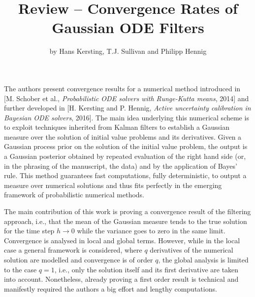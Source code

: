 \documentclass{article}
\title{\myfont Review -- Convergence Rates of Gaussian ODE Filters}
\author{by Hans Kersting, T.J. Sullivan and Philipp Hennig}
\date{}
\begin{document}
\maketitle

The authors present convergence results for a numerical method introduced in [M. Schober et al., \textit{Probabilistic ODE solvers with Runge-Kutta means}, 2014] and further developed in [H. Kersting and P. Hennig, \textit{Active uncertainty calibration in Bayesian ODE solvers}, 2016]. The main idea underlying this numerical scheme is to exploit techniques inherited from Kalman filters to establish a Gaussian measure over the solution of initial value problems and its derivatives. Given a Gaussian process prior on the solution of the initial value problem, the output is a Gaussian posterior obtained by repeated evaluation of the right hand side (or, in the phrasing of the manuscript, the data) and by the application of Bayes' rule. This method guarantees fast computations, fully deterministic, to output a measure over numerical solutions and thus fits perfectly in the emerging framework of probabilistic numerical methods.

The main contribution of this work is proving a convergence result of the filtering approach, i.e., that the mean of the Gaussian measure tends to the true solution for the time step $h \to 0$ while the variance goes to zero in the same limit. Convergence is analysed in local and global terms. However, while in the local case a general framework is considered, where $q$ derivatives of the numerical solution are modelled and convergence is of order $q$, the global analysis is limited to the case $q = 1$, i.e., only the solution itself and its first derivative are taken into account. Nonetheless, already proving a first order result is technical and manifestly required the authors a big effort and lengthy computations.
\end{document}
